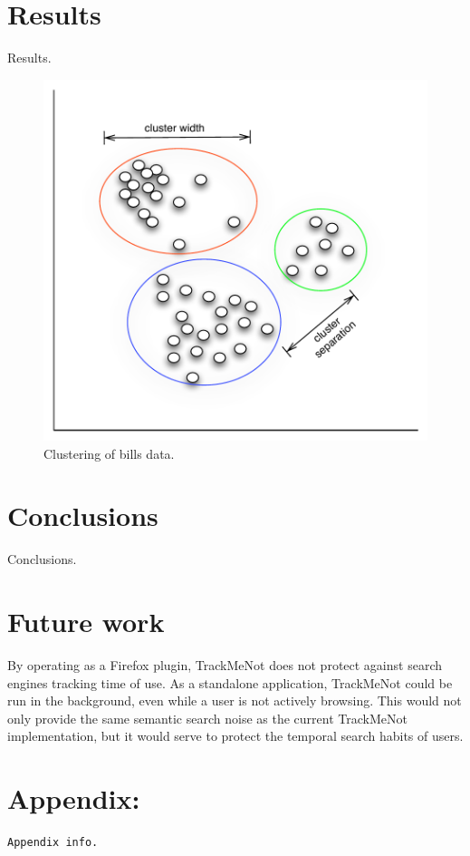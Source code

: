 \documentclass[11pt]{article}
\begin{document}
\begin{multicols}{2}
\section{Results}
\label{sec:results}

Results. \cite{tmn}

  \begin{figure}[h]
    \centering
    \includegraphics[width=\columnwidth]{clusterbill1}
    \caption{Clustering of bills data.}
    \label{fig:cluster.bill}
  \end{figure}

\section{Conclusions}
\label{sec:conc}
Conclusions.

\section{Future work}
\label{sec:future}
By operating as a Firefox plugin, TrackMeNot does not protect against search engines tracking time of use. As a standalone application, TrackMeNot could be run in the background, even while a user is not actively browsing. This would not only provide the same semantic search noise as the current TrackMeNot implementation, but it would serve to protect the temporal search habits of users.





\end{multicols}
\newpage
\begin{appendix} \label{appendix}
\section*{Appendix:}
{\tiny
\begin{verbatim}
Appendix info.
\end{verbatim}
}
\end{appendix}
\end{document}
